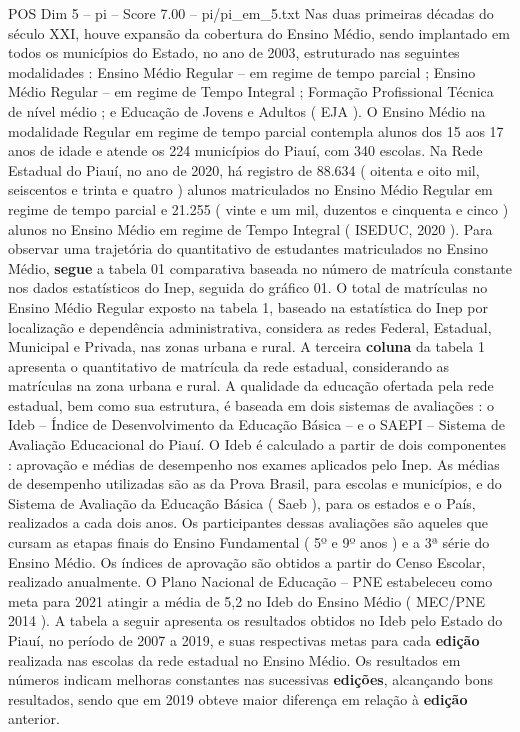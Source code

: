 \begin{textsample}{POS Dim 5 – pi – Score 7.00 – pi/pi\_em\_5.txt}
Nas duas primeiras décadas do século XXI, houve expansão da cobertura do Ensino Médio, sendo implantado em todos os municípios do Estado, no ano de 2003, estruturado nas seguintes modalidades : Ensino Médio Regular – em regime de tempo parcial ; Ensino Médio Regular – em regime de Tempo Integral ; Formação Profissional Técnica de nível médio ; e Educação de Jovens e Adultos ( EJA ).
O Ensino Médio na modalidade Regular em regime de tempo parcial contempla alunos dos 15 aos 17 anos de idade e atende os 224 municípios do Piauí, com 340 escolas.
Na Rede Estadual do Piauí, no ano de 2020, há registro de 88.634 ( oitenta e oito mil, seiscentos e trinta e quatro ) alunos matriculados no Ensino Médio Regular em regime de tempo parcial e 21.255 ( vinte e um mil, duzentos e cinquenta e cinco ) alunos no Ensino Médio em regime de Tempo Integral ( ISEDUC, 2020 ).
Para observar uma trajetória do quantitativo de estudantes matriculados no Ensino Médio, \textbf{segue} a tabela 01 comparativa baseada no número de matrícula constante nos dados estatísticos do Inep, seguida do gráfico 01.
O total de matrículas no Ensino Médio Regular exposto na tabela 1, baseado na estatística do Inep por localização e dependência administrativa, considera as redes Federal, Estadual, Municipal e Privada, nas zonas urbana e rural.
A terceira \textbf{coluna} da tabela 1 apresenta o quantitativo de matrícula da rede estadual, considerando as matrículas na zona urbana e rural.
A qualidade da educação ofertada pela rede estadual, bem como sua estrutura, é baseada em dois sistemas de avaliações : o Ideb – Índice de Desenvolvimento da Educação Básica – e o SAEPI – Sistema de Avaliação Educacional do Piauí.
O Ideb é calculado a partir de dois componentes : aprovação e médias de desempenho nos exames aplicados pelo Inep.
As médias de desempenho utilizadas são as da Prova Brasil, para escolas e municípios, e do Sistema de Avaliação da Educação Básica ( Saeb ), para os estados e o País, realizados a cada dois anos.
Os participantes dessas avaliações são aqueles que cursam as etapas finais do Ensino Fundamental ( 5º e 9º anos ) e a 3ª série do Ensino Médio.
Os índices de aprovação são obtidos a partir do Censo Escolar, realizado anualmente.
O Plano Nacional de Educação – PNE estabeleceu como meta para 2021 atingir a média de 5,2 no Ideb do Ensino Médio ( MEC/PNE 2014 ).
A tabela a seguir apresenta os resultados obtidos no Ideb pelo Estado do Piauí, no período de 2007 a 2019, e suas respectivas metas para cada \textbf{edição} realizada nas escolas da rede estadual no Ensino Médio.
Os resultados em números indicam melhoras constantes nas sucessivas \textbf{edições}, alcançando bons resultados, sendo que em 2019 obteve maior diferença em relação à \textbf{edição} anterior.

\end{textsample}
